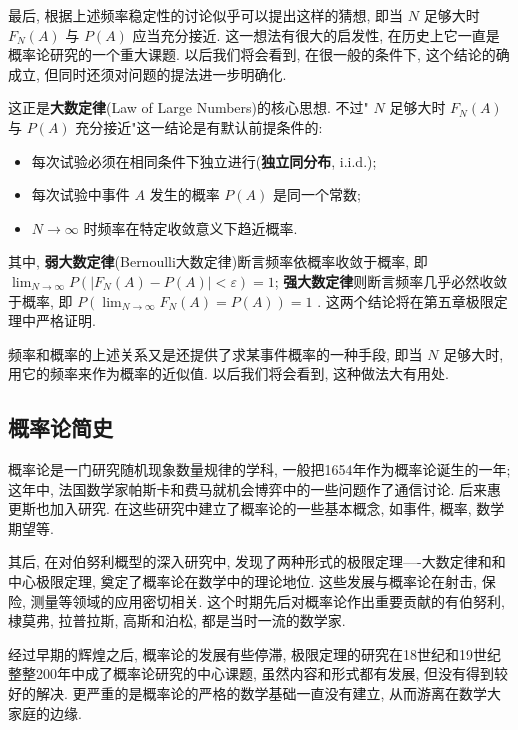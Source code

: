 \documentclass[../../main.tex]{subfiles}
\begin{document}
最后, 根据上述频率稳定性的讨论似乎可以提出这样的猜想, 即当 $N$ 足够大时 $F_N(A)$ 与 $P(A)$ 应当充分接近. 这一想法有很大的启发性, 在历史上它一直是概率论研究的一个重大课题. 以后我们将会看到, 在很一般的条件下, 这个结论的确成立, 但同时还须对问题的提法进一步明确化. 

\begin{myquote}
    这正是\textbf{大数定律}(Law of Large Numbers)的核心思想. 不过" $N$ 足够大时 $F_N(A)$ 与 $P(A)$ 充分接近"这一结论是有默认前提条件的: 

    \begin{itemize}
        \item[1.]每次试验必须在相同条件下独立进行(\textbf{独立同分布}, i.i.d.); 
        \item[2.]每次试验中事件 $A$ 发生的概率 $P(A)$ 是同一个常数; 
        \item[3.] $N\to\infty$ 时频率在特定收敛意义下趋近概率. 
    \end{itemize}

    其中, \textbf{弱大数定律}(Bernoulli大数定律)断言频率依概率收敛于概率, 即 $\lim_{N\to\infty}P(|F_N(A)-P(A)|<\varepsilon)=1 $; \textbf{强大数定律}则断言频率几乎必然收敛于概率, 即 $P(\lim_{N\to\infty}F_N(A)=P(A))=1$ . 这两个结论将在第五章极限定理中严格证明.
\end{myquote}

频率和概率的上述关系又是还提供了求某事件概率的一种手段, 即当 $N$ 足够大时, 用它的频率来作为概率的近似值. 以后我们将会看到, 这种做法大有用处. 

\subsection{概率论简史}

概率论是一门研究随机现象数量规律的学科, 一般把1654年作为概率论诞生的一年;  这年中, 法国数学家帕斯卡和费马就机会博弈中的一些问题作了通信讨论. 后来惠更斯也加入研究. 在这些研究中建立了概率论的一些基本概念, 如事件, 概率, 数学期望等. 

其后, 在对伯努利概型的深入研究中, 发现了两种形式的极限定理----大数定律和和中心极限定理, 奠定了概率论在数学中的理论地位. 这些发展与概率论在射击, 保险, 测量等领域的应用密切相关. 这个时期先后对概率论作出重要贡献的有伯努利, 棣莫弗, 拉普拉斯, 高斯和泊松, 都是当时一流的数学家. 

经过早期的辉煌之后, 概率论的发展有些停滞, 极限定理的研究在18世纪和19世纪整整200年中成了概率论研究的中心课题, 虽然内容和形式都有发展, 但没有得到较好的解决. 更严重的是概率论的严格的数学基础一直没有建立, 从而游离在数学大家庭的边缘. 
\end{document}
